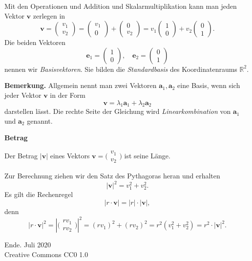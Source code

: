 \documentclass[9pt]{beamer}
\newcommand{\modest}[1]{{\small\color{gray}#1}}
\newcommand{\bv}[1]{\mathbf{#1}}
\newcommand{\R}{\mathbb R}
\newcommand{\strong}[1]{\textsf{\textbf{#1}}}
\newcommand{\icol}[1]{
  \big(\!\begin{smallmatrix}#1\end{smallmatrix}\!\big)%
}
\newcommand{\parspace}{\vspace{0.8em}}
\begin{document}
\begin{frame}
Mit den Operationen und Addition und Skalarmultiplikation kann man
jeden Vektor $\bv v$ zerlegen in
\[\bv v = \begin{pmatrix}v_1\\ v_2\end{pmatrix}
= \begin{pmatrix}v_1\\ 0\end{pmatrix}
+ \begin{pmatrix}0\\ v_2\end{pmatrix}
= v_1\begin{pmatrix}1\\ 0\end{pmatrix}
+ v_2\begin{pmatrix}0\\ 1\end{pmatrix}.\]\pause
Die beiden Vektoren
\[\bv e_1 = \begin{pmatrix}1\\ 0\end{pmatrix},\quad
\bv e_2 = \begin{pmatrix}0\\ 1\end{pmatrix}\]
nennen wir \emph{Basisvektoren}. Sie bilden die \emph{Standardbasis}
des Koordinatenraums $\R^2$.
\end{frame}

\begin{frame}
\strong{Bemerkung.}
Allgemein nennt man zwei Vektoren $\bv a_1,\bv a_2$ eine Basis,
wenn sich jeder Vektor $\bv v$ in der Form
\[\bv v = \lambda_1\bv a_1 + \lambda_2\bv a_2\]
darstellen lässt. Die rechte Seite der Gleichung wird
\emph{Linearkombination} von $\bv a_1$ und $\bv a_2$ genannt.
\end{frame}

\begin{frame}
\begin{center}
\strong{Betrag}
\end{center}
\end{frame}

\begin{frame}
Der Betrag $|\bv v|$ eines Vektors $\bv v = \icol{v_1\\ v_2}$ ist seine Länge.\pause

\parspace
Zur Berechnung ziehen wir den Satz des Pythagoras heran und erhalten
\[|\bv v|^2 = v_1^2+v_2^2.\]\pause
Es gilt die Rechenregel
\[|r\cdot\bv v| = |r|\cdot|\bv v|,\]
denn
\[|r\cdot\bv v|^2 = |\icol{rv_1\\ rv_2}|^2
= (rv_1)^2+(rv_2)^2 = r^2(v_1^2+v_2^2) = r^2\cdot |\bv v|^2.\]
\end{frame}

\begin{frame}
Ende.
\vfill\hfill\modest{Juli 2020}\\
\hfill\modest{Creative Commons CC0 1.0}
\end{frame}
\end{document}
